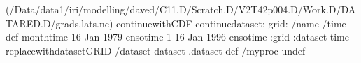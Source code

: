 \begin{ingrid}
(/Data/data1/iri/modelling/daved/C11.D/Scratch.D/V2T42p004.D/Work.D/DATARED.D/grads.lats.nc) continuewithCDF
continuedataset: 
grid:
/name /time def
monthtime
16 Jan 1979 ensotime
1
16 Jan 1996 ensotime
:grid
:dataset
time replacewithdatasetGRID
/dataset dataset .dataset def
/myproc undef
\end{ingrid}
